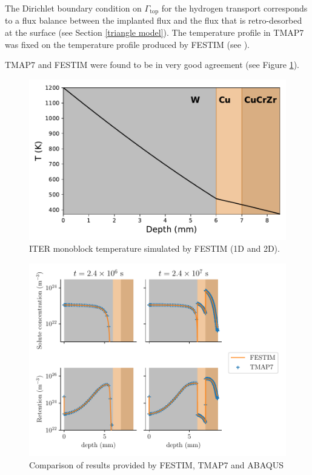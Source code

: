 The Dirichlet boundary condition on $\Gamma_\mathrm{top}$ for the hydrogen transport corresponds to a flux balance between the implanted flux and the flux that is retro-desorbed at the surface (see Section \ref{triangle model}).
The temperature profile in TMAP7 was fixed on the temperature profile produced by FESTIM (see ).

TMAP7 and FESTIM were found to be in very good agreement (see Figure \ref{fig: code comparison}).

\begin{figure} [h]
    \centering
    \includegraphics[width=0.5\linewidth]{Figures/Chapter3/monoblocks/interface_condition/iter case/temperature_1D.pdf}
    \caption{ITER monoblock temperature simulated by FESTIM (1D and 2D).}
\end{figure}

\begin{figure} [h]
    \centering
    \includegraphics[width=\linewidth]{Figures/Chapter3/monoblocks/interface_condition/iter case/comparison_codes.pdf}
    \caption{Comparison of results provided by FESTIM, TMAP7 and ABAQUS}
    \label{fig: code comparison}
\end{figure}

